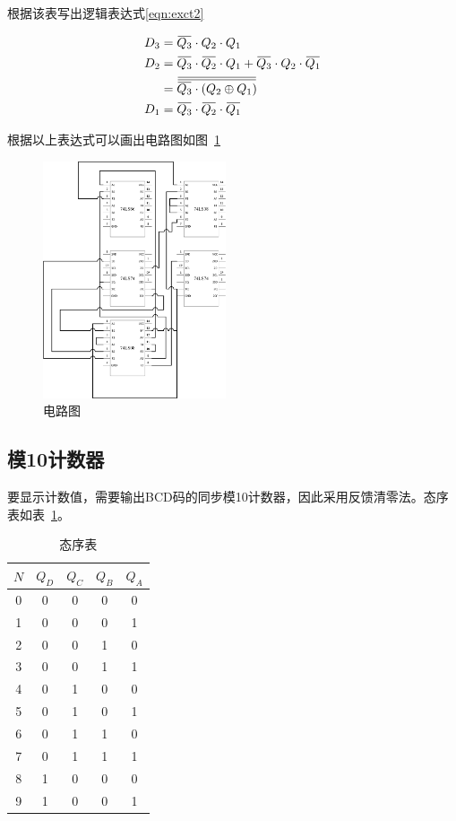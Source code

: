 \documentclass[a4paper,twoside]{ctexart}
\newcommand{\ols}[1]{\mskip.5\thinmuskip\overline{\mskip-.5\thinmuskip {#1} \mskip-.5\thinmuskip}\mskip.5\thinmuskip}
\begin{document}
\begin{spacing}{1.2}
根据该表写出逻辑表达式\eqref{eqn:exct2}

\begin{equation}
	\label{eqn:exct2}
	\begin{aligned}
		D_3&=\ols{Q_3}\cdot Q_2\cdot Q_1 \\
		D_2&=\ols{Q_3}\cdot\ols{Q_2}\cdot Q_1 + \ols{Q_3}\cdot Q_2\cdot\ols{Q_1} \\
		&= \ols{\ols{\ols{Q_3}\cdot(Q_2 \oplus Q_1)}} \\
		D_1&=\ols{Q_3}\cdot\ols{Q_2}\cdot\ols{Q_1} \\
	\end{aligned}
\end{equation}

根据以上表达式可以画出电路图如图~\ref{fig:53}

\begin{figure}[htbp]
	\centering
	\caption{电路图}
	\label{fig:53}
	\includegraphics[width=0.48\textwidth]{53.png}
\end{figure}

\clearpage

\subsection{模10计数器}

要显示计数值，需要输出BCD码的同步模10计数器，因此采用反馈清零法。态序表如表~\ref{tbl:sseq1}。

\begin{table}[htbp]
	\centering
	\caption{态序表}
	\label{tbl:sseq1}
	\begin{tabular}{c|cccc}
		\toprule
		\hline
		$N$&$Q_D$&$Q_C$&$Q_B$&$Q_A$ \\
		\hline
		0&0&0&0&0 \\
		1&0&0&0&1 \\
		2&0&0&1&0 \\
		3&0&0&1&1 \\
		4&0&1&0&0 \\
		5&0&1&0&1 \\
		6&0&1&1&0 \\
		7&0&1&1&1 \\
		8&1&0&0&0 \\
		9&1&0&0&1 \\
		\hline
		\bottomrule
	\end{tabular}
\end{table}


\end{spacing}
\end{document}
